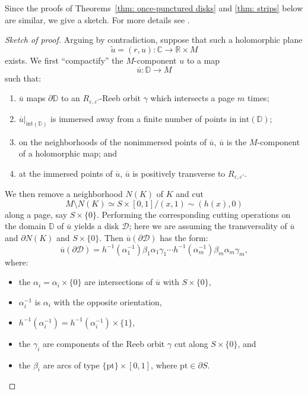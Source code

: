 \documentclass[10pt]{amsart}
\let\mathcal\mathscr
\newcommand{\inte}{\mathrm{int}}
\theoremstyle{plain}
\theoremstyle{definition}
\numberwithin{equation}{subsection}
\newcommand{\CC}{\mathbb{C}}
\newcommand{\RR}{\mathbb{R}}
\newcommand{\bdry}{\partial}
\begin{document}
Since the proofs of Theorems~\ref{thm: once-punctured disks} and \ref{thm: strips} below are similar, we give a sketch. For more details see \cite[\S 8]{CH2}.

\begin{proof}[Sketch of proof]
Arguing by contradiction, suppose that such a holomorphic plane
$$\widetilde u=(r,u): \CC\to \RR\times M$$
exists. We first ``compactify'' the $M$-component $u$ to a map
$$\overline{u}: \mathbb{D}\to M$$
such that:
\begin{enumerate}\renewcommand{\theenumi}{C\arabic{enumi}}
\item\label{enum:C1}
$\overline{u}$ maps $\bdry \mathbb{D}$ to an $R_{\varepsilon,\varepsilon'}$-Reeb orbit $\gamma$ which intersects a page $m$ times;
\item\label{enum:C2}
$\overline{u}|_{\inte(\mathbb{D})}$ is immersed away from a finite number of points in $\inte(\mathbb{D})$;
\item\label{enum:C3}
on the neighborhoods of the nonimmersed points of $\overline{u}$, $\overline{u}$ is the $M$-component of a holomorphic map; and
\item\label{enum:C4}
at the immersed points of $\overline{u}$, $\overline{u}$ is positively transverse to $R_{\varepsilon,\varepsilon'}$.
\end{enumerate}

We then remove a neighborhood $N(K)$ of $K$ and cut
$$M\setminus N(K)\simeq S\times[0,1]/(x,1)\sim (h(x),0)$$
along a page, say $S\times\{0\}$. Performing the corresponding cutting operations on the domain $\mathbb{D}$ of $\overline{u}$ yields a disk $\mathcal{D}$; here we are assuming the transversality of $\overline{u}$ and $\bdry N(K)$ and $S\times\{0\}$. Then $\overline{u}(\bdry \mathcal{D})$ has the form:
\begin{equation}
\overline{u}(\bdry \mathcal{D})=h^{-1}(\alpha_1^{-1})\beta_1\alpha_1\gamma_1\cdots
h^{-1}(\alpha_m^{-1})\beta_m\alpha_m\gamma_m,
\end{equation}
where:
\begin{itemize}
\item the $\alpha_i=\alpha_i\times\{0\}$ are intersections of $\overline{u}$ with $S\times\{0\}$,
\item $\alpha_i^{-1}$ is $\alpha_i$ with the opposite orientation,
\item $h^{-1}(\alpha_i^{-1})=h^{-1}(\alpha_i^{-1})\times\{1\}$,
\item the $\gamma_i$ are components of the Reeb orbit $\gamma$ cut along $S\times\{0\}$, and
\item the $\beta_i$ are arcs of type $\{\mathrm{pt}\}\times [0,1]$, where $\mathrm{pt}\in \bdry S$.
\end{itemize}


\end{proof}
\end{document}
